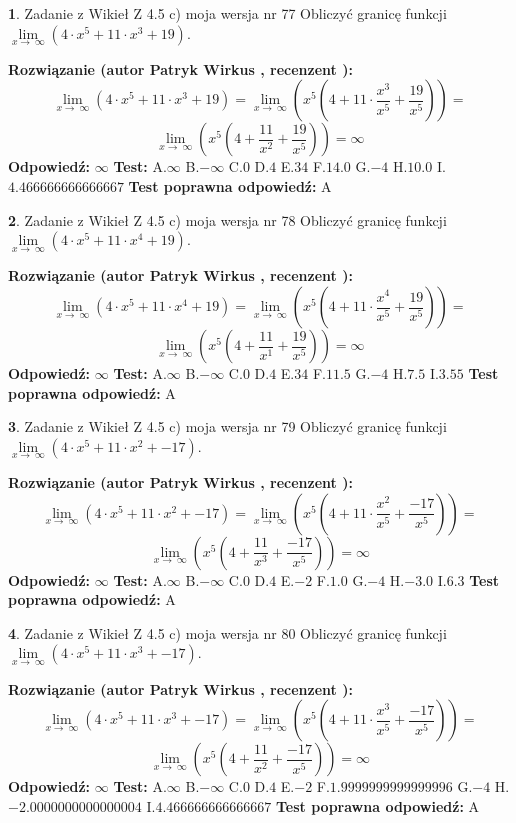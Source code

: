 \documentclass[12pt, a4paper]{article}
\theoremstyle{definition} %
\newtheorem{zad}{}
\newcommand{\zadStart}[1]{\begin{zad}#1\newline}
\newcommand{\zadStop}{\end{zad}}
\newcommand{\rozwStart}[2]{\noindent \textbf{Rozwiązanie (autor #1 , recenzent #2): }\newline}
\newcommand{\rozwStop}{\newline}
\newcommand{\odpStart}{\noindent \textbf{Odpowiedź:}\newline}
\newcommand{\odpStop}{\newline}
\newcommand{\testStart}{\noindent \textbf{Test:}\newline}
\newcommand{\testStop}{\newline}
\newcommand{\kluczStart}{\noindent \textbf{Test poprawna odpowiedź:}\newline}
\newcommand{\kluczStop}{\newline}
\begin{document}
\zadStart{Zadanie z Wikieł Z 4.5 c) moja wersja nr 77}
Obliczyć granicę funkcji  $\lim\limits_{x\to\ \infty}(4 \cdot x^{5}+11 \cdot x^{3}+19)$.
\zadStop
\rozwStart{Patryk Wirkus}{}
$$\lim\limits_{x\to\ \infty}(4 \cdot x^{5}+11 \cdot x^{3}+19) = \lim\limits_{x\to\ \infty}(x^{5}(4 +11 \cdot \frac{x^{3}}{x^{5}}+\frac{19}{x^{5}})) =$$ $$\lim\limits_{x\to\ \infty}(x^{5}(4 +\frac{11}{x^{2}}+\frac{19}{x^{5}})) =\infty$$
\rozwStop
\odpStart
$\infty$
\odpStop
\testStart
A.$\infty$ B.$-\infty$ C.$0$ D.$4$ E.$34$
F.$14.0$ G.$-4$
H.$10.0$
I.$4.466666666666667$
\testStop
\kluczStart
A
\kluczStop



\zadStart{Zadanie z Wikieł Z 4.5 c) moja wersja nr 78}
Obliczyć granicę funkcji  $\lim\limits_{x\to\ \infty}(4 \cdot x^{5}+11 \cdot x^{4}+19)$.
\zadStop
\rozwStart{Patryk Wirkus}{}
$$\lim\limits_{x\to\ \infty}(4 \cdot x^{5}+11 \cdot x^{4}+19) = \lim\limits_{x\to\ \infty}(x^{5}(4 +11 \cdot \frac{x^{4}}{x^{5}}+\frac{19}{x^{5}})) =$$ $$\lim\limits_{x\to\ \infty}(x^{5}(4 +\frac{11}{x^{1}}+\frac{19}{x^{5}})) =\infty$$
\rozwStop
\odpStart
$\infty$
\odpStop
\testStart
A.$\infty$ B.$-\infty$ C.$0$ D.$4$ E.$34$
F.$11.5$ G.$-4$
H.$7.5$
I.$3.55$
\testStop
\kluczStart
A
\kluczStop



\zadStart{Zadanie z Wikieł Z 4.5 c) moja wersja nr 79}
Obliczyć granicę funkcji  $\lim\limits_{x\to\ \infty}(4 \cdot x^{5}+11 \cdot x^{2}+-17)$.
\zadStop
\rozwStart{Patryk Wirkus}{}
$$\lim\limits_{x\to\ \infty}(4 \cdot x^{5}+11 \cdot x^{2}+-17) = \lim\limits_{x\to\ \infty}(x^{5}(4 +11 \cdot \frac{x^{2}}{x^{5}}+\frac{-17}{x^{5}})) =$$ $$\lim\limits_{x\to\ \infty}(x^{5}(4 +\frac{11}{x^{3}}+\frac{-17}{x^{5}})) =\infty$$
\rozwStop
\odpStart
$\infty$
\odpStop
\testStart
A.$\infty$ B.$-\infty$ C.$0$ D.$4$ E.$-2$
F.$1.0$ G.$-4$
H.$-3.0$
I.$6.3$
\testStop
\kluczStart
A
\kluczStop



\zadStart{Zadanie z Wikieł Z 4.5 c) moja wersja nr 80}
Obliczyć granicę funkcji  $\lim\limits_{x\to\ \infty}(4 \cdot x^{5}+11 \cdot x^{3}+-17)$.
\zadStop
\rozwStart{Patryk Wirkus}{}
$$\lim\limits_{x\to\ \infty}(4 \cdot x^{5}+11 \cdot x^{3}+-17) = \lim\limits_{x\to\ \infty}(x^{5}(4 +11 \cdot \frac{x^{3}}{x^{5}}+\frac{-17}{x^{5}})) =$$ $$\lim\limits_{x\to\ \infty}(x^{5}(4 +\frac{11}{x^{2}}+\frac{-17}{x^{5}})) =\infty$$
\rozwStop
\odpStart
$\infty$
\odpStop
\testStart
A.$\infty$ B.$-\infty$ C.$0$ D.$4$ E.$-2$
F.$1.9999999999999996$ G.$-4$
H.$-2.0000000000000004$
I.$4.466666666666667$
\testStop
\kluczStart
A
\kluczStop
\end{document}
